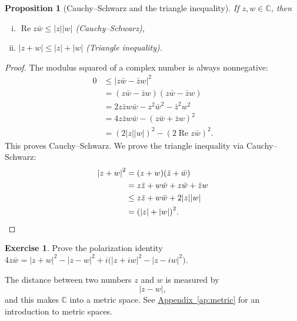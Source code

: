 \documentclass[12pt,openany]{book}
\renewcommand{\Re}{\operatorname{Re}}
\newcommand{\dist}{\operatorname{dist}}
\newcommand{\sabs}[1]{\lvert {#1} \rvert}
\newcommand{\C}{{\mathbb{C}}}
\theoremstyle{plain}
\newtheorem{prop}[thm]{Proposition}
\theoremstyle{remark}
\theoremstyle{definition}
\newenvironment{exbox}{%
    \def\FrameCommand{\vrule width 1pt \relax\hspace {10pt}}%
    \MakeFramed {\advance \hsize -\width \FrameRestore }%
}{%
    \endMakeFramed
}
\theoremstyle{exercise}
\newtheorem{exercise}{Exercise}[section]
\theoremstyle{example}
\newcommand{\Appendixref}[1]{\hyperref[#1]{Appendix~\ref*{#1}}}
\begin{document}
\begin{prop}[Cauchy--Schwarz and the triangle inequality]
If $z,w \in \C$, then
\begin{enumerate}[(i)]
\item
$\Re z\bar{w} \leq \sabs{z} \sabs{w}$ \quad (Cauchy--Schwarz),
\item
$\sabs{z+w} \leq \sabs{z} + \sabs{w}$ \quad (Triangle inequality).
\end{enumerate}
\end{prop}

\begin{proof}
The modulus squared of a complex number is always nonnegative:
\begin{equation*}
\begin{split}
0 & \leq {\sabs{z\bar{w}-\bar{z}w}}^2 \\
  & =    (z\bar{w}-\bar{z}w)(z\bar{w}-\bar{z}w) \\
  & =    2z\bar{z}w\bar{w} - z^2\bar{w}^2 - \bar{z}^2w^2 \\
  & =    4z\bar{z}w\bar{w} - {(z\bar{w}+\bar{z}w)}^2 \\
  & =    {(2\sabs{z}\sabs{w})}^2 - {(2 \Re z\bar{w})}^2 .
\end{split}
\end{equation*}
This proves Cauchy--Schwarz.  We prove the triangle inequality
via Cauchy--Schwarz:
\begin{equation*}
\begin{split}
{\sabs{z+w}}^2 & =    (z+w)(\bar{z}+\bar{w}) \\
               & =    z\bar{z} + w\bar{w} + z\bar{w} + \bar{z}w \\
               & \leq z\bar{z} + w\bar{w} + 2 \sabs{z}\sabs{w} \\
               & =    {(\sabs{z}+\sabs{w})}^2 . \qedhere
\end{split}
\end{equation*}
\end{proof}

\begin{exbox}
\begin{exercise}
Prove the polarization identity
$4 z\bar{w} =
{\sabs{z+w}}^2-{\sabs{z-w}}^2 +i \bigl( {\sabs{z+iw}}^2 - {\sabs{z-iw}}^2 \bigr)$.
\end{exercise}
\end{exbox}

The distance between two numbers $z$ and $w$ is measured by
\begin{equation*}
\sabs{z-w} ,
\end{equation*}
and this makes $\C$ into a metric space.  See \Appendixref{ap:metric}
for an introduction to metric spaces.
\end{document}
